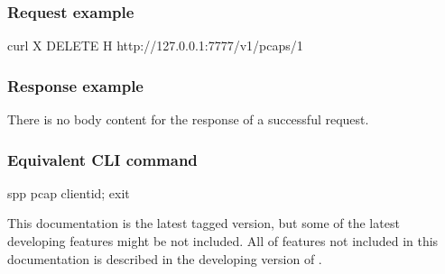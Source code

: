 \documentclass[a4paper,11pt,openany,oneside,english]{sphinxmanual}
\begin{document}
\subsubsection{Request example}
\label{\detokenize{api_ref/spp_pcap:id6}}
\begin{sphinxVerbatim}[commandchars=\\\{\},formatcom=\footnotesize]
 curl \PYGZhy{}X DELETE \PYGZhy{}H  
  http://127.0.0.1:7777/v1/pcaps/1
\end{sphinxVerbatim}


\subsubsection{Response example}
\label{\detokenize{api_ref/spp_pcap:id7}}
There is no body content for the response of a successful  request.


\subsubsection{Equivalent CLI command}
\label{\detokenize{api_ref/spp_pcap:id8}}
\begin{sphinxVerbatim}[commandchars=\\\{\},formatcom=\footnotesize]
spp \PYGZgt{} pcap \PYGZob{}client\PYGZus{}id\PYGZcb{}; exit
\end{sphinxVerbatim}

This documentation is the latest tagged version, but some of the latest
developing features might be not included.
All of features not included in this documentation is described in the
developing version of
.



\renewcommand{\indexname}{Index}
\printindex
\end{document}

